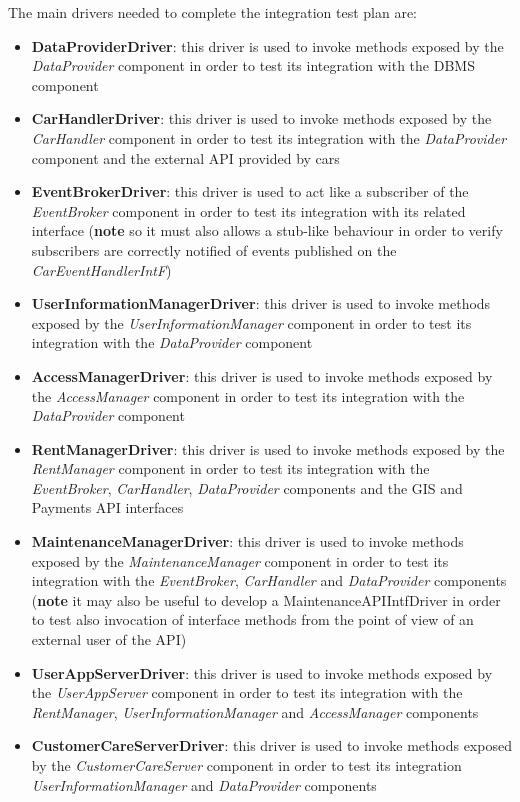 The main drivers needed to complete the integration test plan are:
\begin{itemize}
	\item \textbf{DataProviderDriver}: this driver is used to invoke methods exposed by the \emph{DataProvider} component in order to test its integration with the DBMS component
	\item \textbf{CarHandlerDriver}: this driver is used to invoke methods exposed by the \emph{CarHandler} component in order to test its integration with the \emph{DataProvider} component and the external API provided by cars
	\item \textbf{EventBrokerDriver}: this driver is used to act like a subscriber of the \emph{EventBroker} component in order to test its integration with its related interface (\textbf{note} so it must also allows a stub-like behaviour in order to verify subscribers are correctly notified of events published on the \emph{CarEventHandlerIntF})
	\item \textbf{UserInformationManagerDriver}: this driver is used to invoke methods exposed by the \emph{UserInformationManager} component in order to test its integration with the \emph{DataProvider} component
	\item \textbf{AccessManagerDriver}: this driver is used to invoke methods exposed by the \emph{AccessManager} component in order to test its integration with the \emph{DataProvider} component
	\item \textbf{RentManagerDriver}: this driver is used to invoke methods exposed by the \emph{RentManager} component in order to test its integration with the \emph{EventBroker},  \emph{CarHandler}, \emph{DataProvider} components and the GIS and Payments API interfaces
	\item \textbf{MaintenanceManagerDriver}: this driver is used to invoke methods exposed by the \emph{MaintenanceManager} component in order to test its integration with the \emph{EventBroker},  \emph{CarHandler} and \emph{DataProvider} components (\textbf{note} it may also be useful to develop a MaintenanceAPIIntfDriver in order to test also invocation of interface methods from the point of view of an external user of the API)
	\item \textbf{UserAppServerDriver}: this driver is used to invoke methods exposed by the \emph{UserAppServer} component in order to test its integration with the \emph{RentManager}, \emph{UserInformationManager} and \emph{AccessManager} components
	\item \textbf{CustomerCareServerDriver}: this driver is used to invoke methods exposed by the \emph{CustomerCareServer} component in order to test its integration \emph{UserInformationManager} and \emph{DataProvider} components
\end{itemize}

